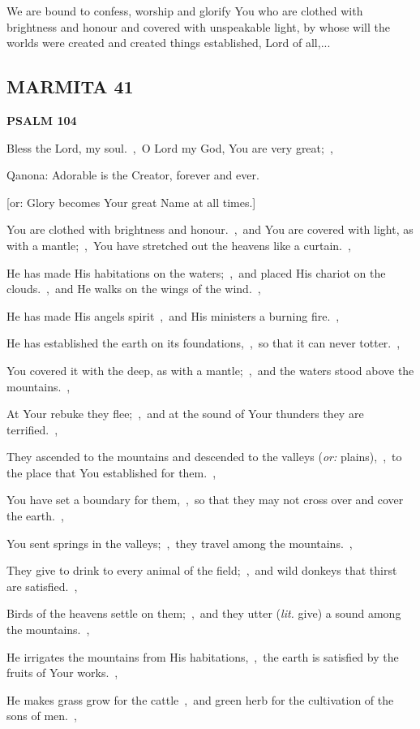 \documentclass[12pt,twoside,a5paper]{article}
\newcommand{\marmita}[1]{\subsection*{MARMITA {#1}}}
\newcommand{\psalm}[1]{\textbf{PSALM {#1}}\nopagebreak}
\newcommand{\slota}[1]{\liturgicalhint{Slota.} #1}
\newcommand{\translationoption}[1]{\emph{or:} #1}
\newcommand{\translationliteral}[1]{\emph{lit.} #1}
\begin{document}
\slota{We are bound to confess, worship and glorify You who are clothed with brightness and honour and covered with unspeakable light, by whose will the worlds were created and created things established, Lord of all,...}

\marmita{41}

\psalm{104}

\begin{normalparskip}
  Bless the Lord, my soul.~\sep\ O Lord my God, You are very great;~\sep

  Qanona: Adorable is the Creator, forever and ever.

  [or: Glory becomes Your great Name at all times.]

  You are clothed with brightness and honour.~\sep\ and You are covered with light, as with a mantle;~\sep\ You have stretched out the heavens like a curtain.~\sep

  He has made His habitations on the waters;~\sep\ and placed His chariot on the clouds.~\sep\ and He walks on the wings of the wind.~\sep

  He has made His angels spirit~\sep\ and His ministers a burning fire.~\sep

  He has established the earth on its foundations,~\sep\ so that it can never totter.~\sep

  You covered it with the deep, as with a mantle;~\sep\ and the waters stood above the mountains.~\sep

  At Your rebuke they flee;~\sep\ and at the sound of Your thunders they are terrified.~\sep

  They ascended to the mountains and descended to the valleys (\translationoption{plains}),~\sep\ to the place that You established for them.~\sep

  You have set a boundary for them,~\sep\ so that they may not cross over and cover the earth.~\sep

  You sent springs in the valleys;~\sep\ they travel among the mountains.~\sep

  They give to drink to every animal of the field;~\sep\ and wild donkeys that thirst are satisfied.~\sep

  Birds of the heavens settle on them;~\sep\ and they utter (\translationliteral{give}) a sound among the mountains.~\sep

  He irrigates the mountains from His habitations,~\sep\ the earth is satisfied by the fruits of Your works.~\sep

  He makes grass grow for the cattle~\sep\ and green herb for the cultivation of the sons of men.~\sep


\end{normalparskip}
\end{document}

